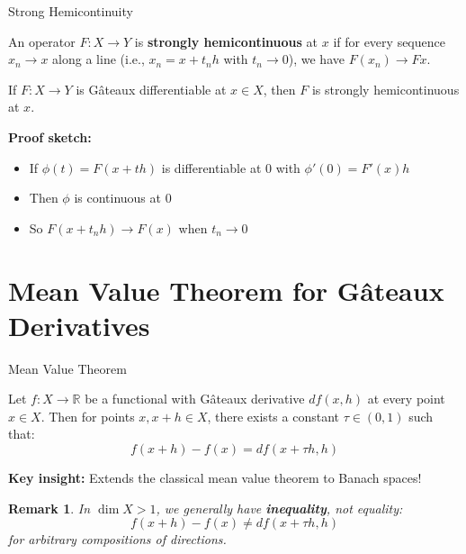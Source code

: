 \documentclass[aspectratio=169,10pt]{beamer}
\newtheorem{remark}[theorem]{Remark}
\begin{document}
\begin{frame}{Strong Hemicontinuity}
  \begin{definition}
    An operator $F: X \to Y$ is \textbf{strongly hemicontinuous} at $x$ if for every sequence $x_n \to x$ along a line (i.e., $x_n = x + t_n h$ with $t_n \to 0$), we have $F(x_n) \to Fx$.
  \end{definition}

  \begin{theorem}[Theorem 3.5]
    If $F: X \to Y$ is Gâteaux differentiable at $x \in X$, then $F$ is strongly hemicontinuous at $x$.
  \end{theorem}

  \textbf{Proof sketch:}
  \begin{itemize}
    \item If $\phi(t) = F(x + th)$ is differentiable at 0 with $\phi'(0) = F'(x)h$
    \item Then $\phi$ is continuous at 0
    \item So $F(x + t_n h) \to F(x)$ when $t_n \to 0$
  \end{itemize}
\end{frame}


\section{Mean Value Theorem for Gâteaux Derivatives}

\begin{frame}{Mean Value Theorem}
  \begin{theorem}
    Let $f: X \to \mathbb{R}$ be a functional with Gâteaux derivative $df(x, h)$ at every point $x \in X$. Then for points $x, x+h \in X$, there exists a constant $\tau \in (0, 1)$ such that:
    \[
      f(x + h) - f(x) = df(x + \tau h, h)
    \]
  \end{theorem}

  \textbf{Key insight:} Extends the classical mean value theorem to Banach spaces!

  \begin{remark}
    In $\dim X > 1$, we generally have \textbf{inequality}, not equality:
    \[
      f(x + h) - f(x) \neq df(x + \tau h, h)
    \]
    for arbitrary compositions of directions.
  \end{remark}
\end{frame}
\end{document}
